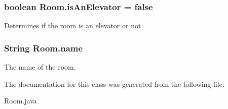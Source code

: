 \subsubsection[{is\+An\+Elevator}]{\setlength{\rightskip}{0pt plus 5cm}boolean Room.\+is\+An\+Elevator = false\hspace{0.3cm}{\ttfamily [protected]}}\label{classRoom_a9ae4a56ee28e7e6cae000555032a8e41}
Determines if the room is an elevator or not \hypertarget{classRoom_a30e9fb0290f64b567572d2f4b4fac4d9}{}
\subsubsection[{name}]{\setlength{\rightskip}{0pt plus 5cm}String Room.\+name\hspace{0.3cm}{\ttfamily [protected]}}\label{classRoom_a30e9fb0290f64b567572d2f4b4fac4d9}
The name of the room. 

The documentation for this class was generated from the following file\+:\begin{DoxyCompactItemize}
\item 
Room.\+java\end{DoxyCompactItemize}
